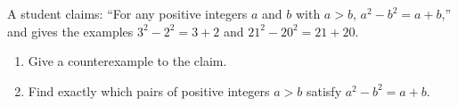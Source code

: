 A student claims: ``For any positive integers $a$ and $b$ with $a>b$, $a^2-b^2=a+b$,'' and gives the examples $3^2-2^2=3+2$ and $21^2-20^2=21+20$.
\begin{enumerate}
\item[(a)] Give a counterexample to the claim.
\item[(b)] Find exactly which pairs of positive integers $a>b$ satisfy $a^2-b^2=a+b$.
\end{enumerate}
